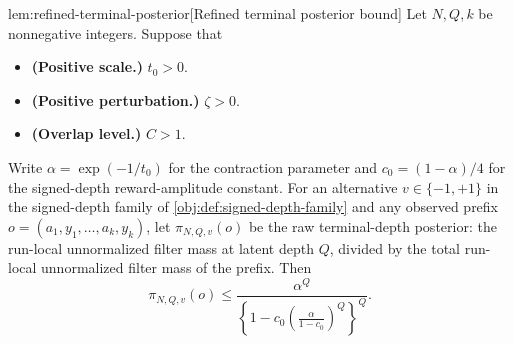 \documentclass[11pt]{article}
\begin{document}
\begin{lemmav}{lem:refined-terminal-posterior}[Refined terminal posterior bound]
Let \(N,Q,k\) be nonnegative integers. Suppose that
\begin{itemize}
\item \textbf{(Positive scale.)} \(t_0>0\).
\item \textbf{(Positive perturbation.)} \(\zeta>0\).
\item \textbf{(Overlap level.)} \(C>1\).
\end{itemize}
Write \(\alpha=\exp(-1/t_0)\) for the contraction parameter and
\(c_0=(1-\alpha)/4\) for the signed-depth reward-amplitude constant. For an
alternative \(v\in\{-1,+1\}\) in the signed-depth family of
\cref{obj:def:signed-depth-family} and any observed prefix
\(o=(a_1,y_1,\ldots,a_k,y_k)\), let \(\pi_{N,Q,v}(o)\) be the raw
terminal-depth posterior: the run-local unnormalized filter mass at latent
depth \(Q\), divided by the total run-local unnormalized filter mass of the
prefix. Then
\[
\pi_{N,Q,v}(o)
\le
\frac{\alpha^Q}
{\left\{1-c_0\left(\frac{\alpha}{1-c_0}\right)^Q\right\}^Q}.
\]
\end{lemmav}
\end{document}
